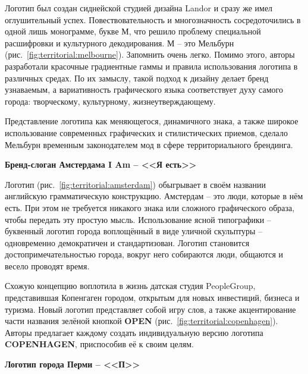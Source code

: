 Логотип был создан сиднейской студией дизайна  Landor  и сразу же имел оглушительный
успех. Повествовательность и многозначность сосредоточились в одной лишь монограмме, букве М, что
решило проблему специальной расшифровки и культурного декодирования. М -- это Мельбурн
(рис.~\ref{fig:territorial:melbourne}). Запомнить очень легко. Помимо этого, авторы разработали
красочные градиентные гаммы и правила использования логотипа в различных средах. По их замыслу,
такой подход к дизайну делает бренд узнаваемым, а вариативность графического языка соответствует
духу самого города: творческому, культурному, жизнеутверждающему.

Представление логотипа как меняющегося, динамичного знака, а также широкое использование современных
графических и стилистических приемов, сделало Мельбурн временным законодателем мод в сфере
территориального брендинга.

\textbf{Бренд-слоган Амстердама I Am -- <<Я есть>>}

Логотип (рис.~\ref{fig:territorial:amsterdam}) обыгрывает в своём названии английскую грамматическую
конструкцию.  Амстердам -- это люди, которые в нём есть. При этом не требуется никакого знака или
сложного графического образа, чтобы передать эту простую мысль. Использование ясной типографики --
буквенный логотип города воплощённый в виде уличной скульптуры -- одновременно демократичен и
стандартизован. Логотип становится достопримечательностью города, вокруг него собираются люди,
общаются и весело проводят время.

Схожую концепцию воплотила в жизнь датская студия PeopleGroup, представившая Копенгаген городом,
открытым для новых инвестиций, бизнеса и туризма. Новый логотип представляет собой игру слов, а
также акцентирование части названия зелёной кнопкой \textbf{OPEN}
(рис.~\ref{fig:territorial:copenhagen}). Авторы предлагает каждому создать
индивидуальную версию логотипа \textbf{COPENHAGEN}, приспособив её к своим целям.

\textbf{Логотип города Перми -- <<П>>}

